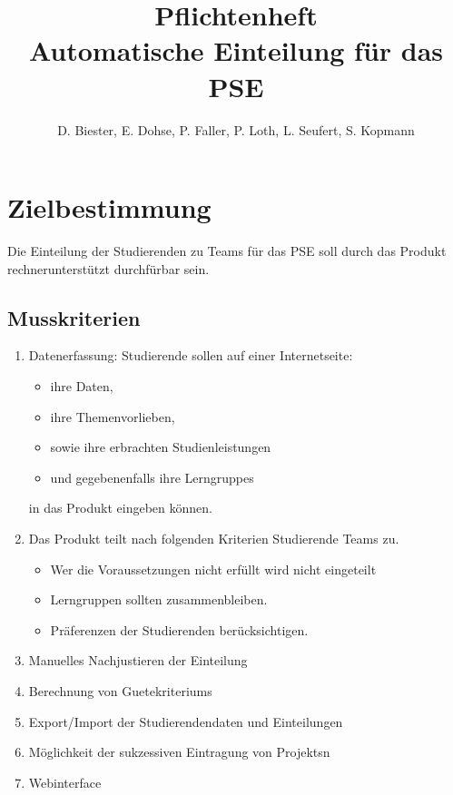 \documentclass[parskip=full]{scrartcl}
\newcommand{\swtLabel}[1]{\textbf{\textbackslash #1\arabic*0\textbackslash}}
\begin{document}
\title{Pflichtenheft \\
        \large Automatische Einteilung für das PSE}

\author{D. Biester, E. Dohse, P. Faller, P. Loth, L. Seufert, S. Kopmann}
        
\maketitle
 
\pagebreak
\tableofcontents
\pagebreak

\section{Zielbestimmung}
Die Einteilung der Studierenden zu Teams für das \gls{PSE} soll durch das Produkt
rechnerunterstützt durchfürbar sein.


\subsection{Musskriterien}
 \begin{enumerate}[label=\swtLabel{M}]
   \item Datenerfassung: Studierende sollen auf einer Internetseite:   
   \begin{itemize}
     \item ihre Daten, %
     \item ihre Themenvorlieben, 
     \item sowie ihre erbrachten Studienleistungen 
     \item und gegebenenfalls ihre \glspl{Lerngruppe}
   \end{itemize}
   in das Produkt eingeben können.
   \item Das Produkt teilt nach folgenden Kriterien Studierende Teams zu.
   \begin{itemize}
     \item Wer die Voraussetzungen nicht erfüllt wird nicht eingeteilt
     \item Lerngruppen sollten zusammenbleiben.
     \item Präferenzen der Studierenden berücksichtigen.
   \end{itemize}
   
   \item Manuelles Nachjustieren der Einteilung
   \item Berechnung von \glspl{Guetekriterium}
   \item Export/Import der Studierendendaten und
   Einteilungen %
   \item Möglichkeit der sukzessiven Eintragung von \glspl{Projekt}n
   \item Webinterface   
 \end{enumerate}
\end{document}
